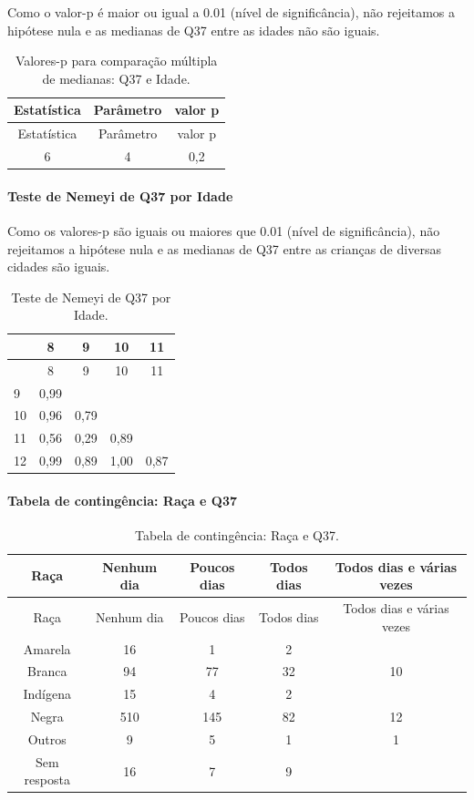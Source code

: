 \documentclass[]{article}
\let\oldparagraph\paragraph
\renewcommand{\paragraph}[1]{\oldparagraph{#1}\mbox{}}
\begin{document}
Como o valor-p é maior ou igual a 0.01 (nível de significância), não rejeitamos a hipótese nula e as medianas de Q37 entre as idades não são iguais.

\begin{longtable}[]{@{}ccc@{}}
\caption{\label{tab:unnamed-chunk-1396}Valores-p para comparação múltipla de medianas: Q37 e Idade.}\tabularnewline
\toprule
Estatística & Parâmetro & valor p\tabularnewline
\midrule
\endfirsthead
\toprule
Estatística & Parâmetro & valor p\tabularnewline
\midrule
\endhead
6 & 4 & 0,2\tabularnewline
\bottomrule
\end{longtable}

\hypertarget{teste-de-nemeyi-de-q37-por-idade}{%
\paragraph{Teste de Nemeyi de Q37 por Idade}\label{teste-de-nemeyi-de-q37-por-idade}}

Como os valores-p são iguais ou maiores que 0.01 (nível de significância), não rejeitamos a hipótese nula e as medianas de Q37 entre as crianças de diversas cidades são iguais.

\begin{longtable}[]{@{}lcccc@{}}
\caption{\label{tab:unnamed-chunk-1398}Teste de Nemeyi de Q37 por Idade.}\tabularnewline
\toprule
& 8 & 9 & 10 & 11\tabularnewline
\midrule
\endfirsthead
\toprule
& 8 & 9 & 10 & 11\tabularnewline
\midrule
\endhead
9 & 0,99 & & &\tabularnewline
10 & 0,96 & 0,79 & &\tabularnewline
11 & 0,56 & 0,29 & 0,89 &\tabularnewline
12 & 0,99 & 0,89 & 1,00 & 0,87\tabularnewline
\bottomrule
\end{longtable}

\cleardoublepage

\hypertarget{tabela-de-continguxeancia-rauxe7a-e-q37}{%
\paragraph{Tabela de contingência: Raça e Q37}\label{tabela-de-continguxeancia-rauxe7a-e-q37}}

\begin{longtable}[]{@{}ccccc@{}}
\caption{\label{tab:unnamed-chunk-1399}Tabela de contingência: Raça e Q37.}\tabularnewline
\toprule
Raça & Nenhum dia & Poucos dias & Todos dias & Todos dias e várias vezes\tabularnewline
\midrule
\endfirsthead
\toprule
Raça & Nenhum dia & Poucos dias & Todos dias & Todos dias e várias vezes\tabularnewline
\midrule
\endhead
Amarela & 16 & 1 & 2 &\tabularnewline
Branca & 94 & 77 & 32 & 10\tabularnewline
Indígena & 15 & 4 & 2 &\tabularnewline
Negra & 510 & 145 & 82 & 12\tabularnewline
Outros & 9 & 5 & 1 & 1\tabularnewline
Sem resposta & 16 & 7 & 9 &\tabularnewline
\bottomrule
\end{longtable}
\end{document}
